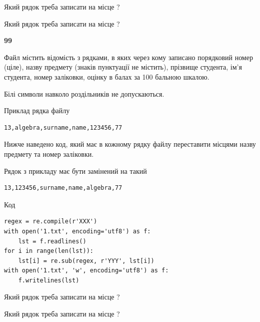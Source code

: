 Який рядок треба записати на місце  ?\par
\vspace{5mm}


Який рядок треба записати на місце  ?\par


\newpage

{\begin {center}\textbf{ 99}\end {center}}\par
Файл  містить відомість з рядками, в яких через кому записано поряд\-ковий номер (ціле), назву предмету (знаків пунктуації не містить), прізвище студента, ім'я студента, номер заліковки, оцінку в балах за 100 бальною шкалою.

Білі символи навколо роздільників не допускаються.

Приклад рядка файлу



\begin{verbatim}
13,algebra,surname,name,123456,77
\end{verbatim}


Нижче наведено код, який має в кожному рядку файлу переставити місцями назву предмету та номер заліковки.

Рядок з прикладу має бути замінений на такий



\begin{verbatim}
13,123456,surname,name,algebra,77
\end{verbatim}




Код



\begin{verbatim}
regex = re.compile(r'XXX')
with open('1.txt', encoding='utf8') as f:
    lst = f.readlines()
for i in range(len(lst)):
    lst[i] = re.sub(regex, r'YYY', lst[i])
with open('1.txt', 'w', encoding='utf8') as f:
    f.writelines(lst)
\end{verbatim}







Який рядок треба записати на місце  ?\par
\vspace{5mm}


Який рядок треба записати на місце  ?\par


